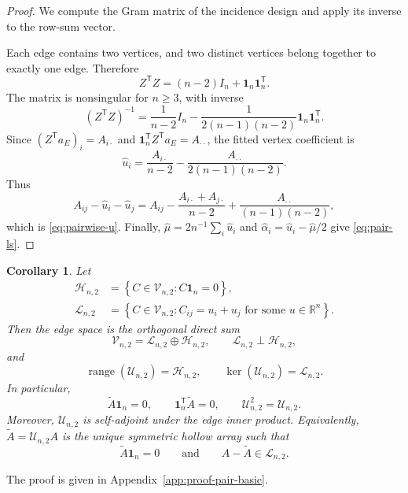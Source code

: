\documentclass[11pt]{article}
\theoremstyle{plain}
\newtheorem{corollary}[theorem]{Corollary}
\theoremstyle{definition}
\theoremstyle{remark}
\newcommand{\R}{\mathbb R}
\newcommand{\range}{\operatorname{range}}
\newcommand{\one}{\mathbf 1}
\newcommand{\cU}{\mathcal U}
\newcommand{\cH}{\mathcal H}
\newcommand{\cL}{\mathcal L}
\newcommand{\cV}{\mathcal V}
\begin{document}
\begin{proof}
We compute the Gram matrix of the incidence design and apply its inverse to
the row-sum vector.

Each edge contains two vertices, and two distinct vertices belong together to
exactly one edge.  Therefore
  \begin{equation*}
 Z^\mathsf TZ=(n-2)I_n+\one_n\one_n^\mathsf T.
\end{equation*}
The matrix is nonsingular for $n\ge3$, with inverse
\begin{equation}\label{eq:ztz-inverse}
 (Z^\mathsf TZ)^{-1}
 =\frac{1}{n-2}I_n
 -\frac{1}{2(n-1)(n-2)}\one_n\one_n^\mathsf T.
\end{equation}
Since $(Z^\mathsf Ta_E)_i=A_{i\cdot}$ and
$\one_n^\mathsf TZ^\mathsf Ta_E=A_{\cdot\cdot}$, the fitted vertex coefficient is
\[
 \widehat u_i
 =\frac{A_{i\cdot}}{n-2}
  -\frac{A_{\cdot\cdot}}{2(n-1)(n-2)}.
\]
Thus
\[
 A_{ij}-\widehat u_i-\widehat u_j
 =A_{ij}-\frac{A_{i\cdot}+A_{j\cdot}}{n-2}
  +\frac{A_{\cdot\cdot}}{(n-1)(n-2)},
\]
which is \eqref{eq:pairwise-u}.  Finally,
$\widehat\mu=2n^{-1}\sum_i\widehat u_i$ and
$\widehat\alpha_i=\widehat u_i-\widehat\mu/2$ give
\eqref{eq:pair-ls}.
\end{proof}


\begin{corollary}
\label{cor:pair-basic}
Let
\begin{align*}
 \cH_{n,2}
 &=\left\{C\in\cV_{n,2}:C\one_n=0\right\},\\
 \cL_{n,2}
 &=\left\{C\in\cV_{n,2}:C_{ij}=u_i+u_j
      \text{ for some }u\in\R^n\right\}.
\end{align*}
Then the edge space is the orthogonal direct sum
  \begin{equation*}
 \cV_{n,2}=\cL_{n,2}\oplus\cH_{n,2},
 \qquad \cL_{n,2}\perp\cH_{n,2},
\end{equation*}
and
\[
 \range(\cU_{n,2})=\cH_{n,2},
 \qquad
 \ker(\cU_{n,2})=\cL_{n,2}.
\]
In particular,
  \begin{equation*}
 \widetilde A\one_n=0,
 \qquad
 \one_n^\mathsf T\widetilde A=0,
 \qquad
 \cU_{n,2}^2=\cU_{n,2}.
\end{equation*}
Moreover, $\cU_{n,2}$ is self-adjoint under the edge inner product.
Equivalently, $\widetilde A=\cU_{n,2}A$ is the unique symmetric hollow array
such that
\[
 \widetilde A\one_n=0
 \qquad\text{and}\qquad
 A-\widetilde A\in\cL_{n,2}.
\]
\end{corollary}

\noindent The proof is given in
Appendix~\ref{app:proof-pair-basic}.
\end{document}
